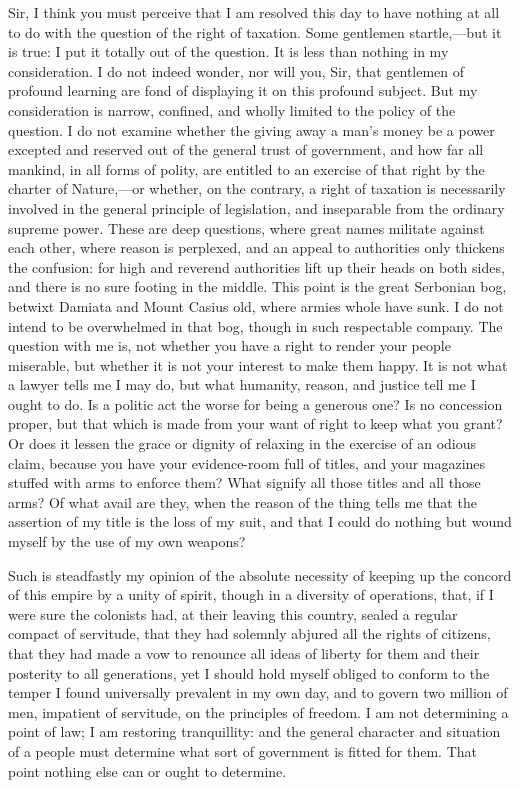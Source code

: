 Sir, I think you must perceive that I am resolved this day to have nothing at all to do with the question of the right of taxation. Some gentlemen startle,—but it is true: I put it totally out of the question. It is less than nothing in my consideration. I do not indeed wonder, nor will you, Sir, that gentlemen of profound learning are fond of displaying it on this profound subject. But my consideration is narrow, confined, and wholly limited to the policy of the question. I do not examine whether the giving away a man's money be a power excepted and reserved out of the general trust of government, and how far all mankind, in all forms of polity, are entitled to an exercise of that right by the charter of Nature,—or whether, on the contrary, a right of taxation is necessarily involved in the general principle of legislation, and inseparable from the ordinary supreme power. These are deep questions, where great names militate against each other, where reason is perplexed, and an appeal to authorities only thickens the confusion: for high and reverend authorities lift up their heads on both sides, and there is no sure footing in the middle. This point is the great Serbonian bog, betwixt Damiata and Mount Casius old, where armies whole have sunk. I do not intend to be overwhelmed in that bog, though in such respectable company. The question with me is, not whether you have a right to render your people miserable, but whether it is not your interest to make them happy. It is not what a lawyer tells me I may do, but what humanity, reason, and justice tell me I ought to do. Is a politic act the worse for being a generous one? Is no concession proper, but that which is made from your want of right to keep what you grant? Or does it lessen the grace or dignity of relaxing in the exercise of an odious claim, because you have your evidence-room full of titles, and your magazines stuffed with arms to enforce them? What signify all those titles and all those arms? Of what avail are they, when the reason of the thing tells me that the assertion of my title is the loss of my suit, and that I could do nothing but wound myself by the use of my own weapons?

Such is steadfastly my opinion of the absolute necessity of keeping up the concord of this empire by a unity of spirit, though in a diversity of operations, that, if I were sure the colonists had, at their leaving this country, sealed a regular compact of servitude, that they had solemnly abjured all the rights of citizens, that they had made a vow to renounce all ideas of liberty for them and their posterity to all generations, yet I should hold myself obliged to conform to the temper I found universally prevalent in my own day, and to govern two million of men, impatient of servitude, on the principles of freedom. I am not determining a point of law; I am restoring tranquillity: and the general character and situation of a people must determine what sort of government is fitted for them. That point nothing else can or ought to determine.

